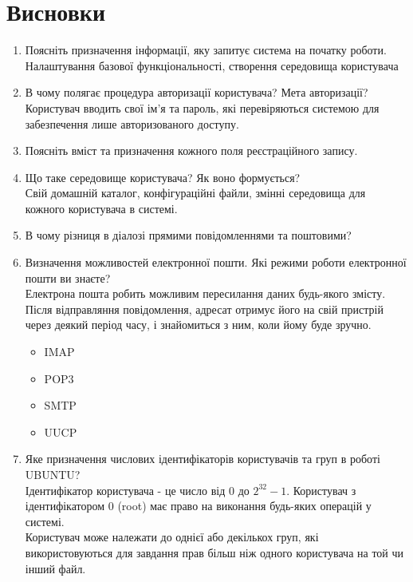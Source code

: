 \section{Висновки}
\label{sec:summary}

\begin{enumerate}
    \item Поясніть призначення інформації, яку запитує система на початку роботи. \\
          Налаштування базової функціональності, створення середовища користувача
    \item В чому полягає процедура авторизації користувача? Мета авторизації? \\
          Користувач вводить свої ім'я та пароль, які перевіряються системою
          для забезпечення лише авторизованого доступу.
    \item Поясніть вміст та призначення кожного поля реєстраційного запису.
    \item Що таке середовище користувача? Як воно формується? \\
          Свій домашній каталог, конфігураційні файли,
          змінні середовища для кожного користувача в системі.
    \item В чому різниця в діалозі прямими повідомленнями та поштовими?
    \item Визначення можливостей електронної пошти.
          Які режими роботи електронної пошти ви знаєте? \\
          Електрона пошта робить можливим пересилання даних будь-якого змісту.
          Після відправляння повідомлення, адресат отримує його на свій пристрій
          через деякий період часу, і знайомиться з ним, коли йому буде зручно.
          \begin{itemize}
              \item IMAP
              \item POP3
              \item SMTP
              \item UUCP
          \end{itemize}
    \item Яке призначення числових ідентифікаторів користувачів та груп в роботі UBUNTU? \\
          Ідентифікатор користувача - це число від $0$ до $2^{32} - 1$.
          Користувач з ідентифікатором 0 (root) має право
          на виконання будь-яких операцій у системі. \\
          Користувач може належати до однієї або декількох груп,
          які використовуються для завдання прав більш ніж
          одного користувача на той чи інший файл.
\end{enumerate}
